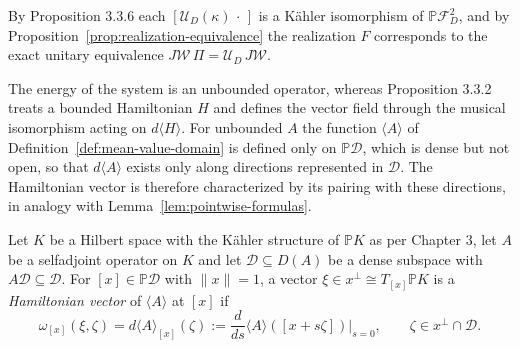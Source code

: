 \noindent By Proposition 3.3.6 each $[\mathcal{U}_D(\kappa)\,\cdot\,]$ is a Kähler isomorphism of $\mathbb{P}\mathcal{F}_D^2$, and by Proposition~\ref{prop:realization-equivalence} the realization $F$ corresponds to the exact unitary equivalence $J\mathcal{W}\,\Pi=\mathcal{U}_D\,J\mathcal{W}$.

The energy of the system is an unbounded operator, whereas Proposition 3.3.2 treats a bounded Hamiltonian $H$ and defines the vector field through the musical isomorphism acting on $d\langle H\rangle$. For unbounded $A$ the function $\langle A\rangle$ of Definition~\ref{def:mean-value-domain} is defined only on $\mathbb{P}\mathcal{D}$, which is dense but not open, so that $d\langle A\rangle$ exists only along directions represented in $\mathcal{D}$. The Hamiltonian vector is therefore characterized by its pairing with these directions, in analogy with Lemma~\ref{lem:pointwise-formulas}.

\begin{definition}\label{def:hamiltonian-vector}
	Let $K$ be a Hilbert space with the Kähler structure of $\mathbb{P}K$ as per Chapter 3, let $A$ be a selfadjoint operator on $K$ and let $\mathcal{D}\subseteq D(A)$ be a dense subspace with $A\mathcal{D}\subseteq\mathcal{D}$. For $[x]\in\mathbb{P}\mathcal{D}$ with $\|x\|=1$, a vector $\xi\in x^\perp\cong T_{[x]}\mathbb{P}K$ is a \emph{Hamiltonian vector} of $\langle A\rangle$ at $[x]$ if
	\begin{equation*}
		\omega_{[x]}(\xi,\zeta)=d\langle A\rangle_{[x]}(\zeta):=\frac{d}{ds}\langle A\rangle([x+s\zeta])\Big|_{s=0},\qquad \zeta\in x^\perp\cap\mathcal{D}.
	\end{equation*}
\end{definition}

